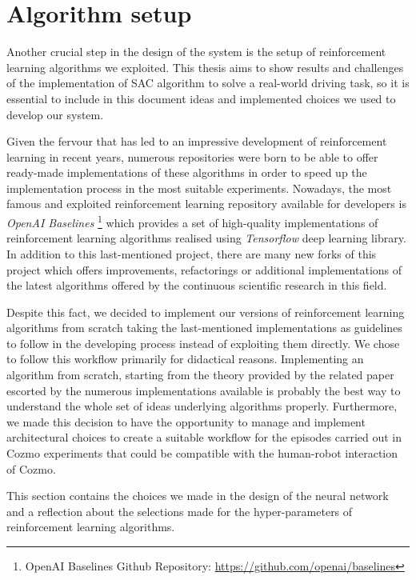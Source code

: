 \section{Algorithm setup}

Another crucial step in the design of the system is the setup of reinforcement learning algorithms we exploited.
This thesis aims to show results and challenges of the implementation of SAC algorithm to solve a real-world driving task, so it is essential to include in this document ideas and implemented choices we used to develop our system.

Given the fervour that has led to an impressive development of reinforcement learning in recent years, numerous repositories were born to be able to offer ready-made implementations of these algorithms in order to speed up the implementation process in the most suitable experiments.
Nowadays, the most famous and exploited reinforcement learning repository available for developers is \textit{OpenAI Baselines} \footnote{OpenAI Baselines Github Repository: \href{https://github.com/openai/baselines}{https://github.com/openai/baselines}} which provides a set of high-quality implementations of reinforcement learning algorithms realised using \textit{Tensorflow} deep learning library.
In addition to this last-mentioned project, there are many new forks of this project which offers improvements, refactorings or additional implementations of the latest algorithms offered by the continuous scientific research in this field.

Despite this fact, we decided to implement our versions of reinforcement learning algorithms from scratch taking the last-mentioned implementations as guidelines to follow in the developing process instead of exploiting them directly.
We chose to follow this workflow primarily for didactical reasons.
Implementing an algorithm from scratch, starting from the theory provided by the related paper escorted by the numerous implementations available is probably the best way to understand the whole set of ideas underlying algorithms properly.
Furthermore, we made this decision to have the opportunity to manage and implement architectural choices to create a suitable workflow for the episodes carried out in Cozmo experiments that could be compatible with the human-robot interaction of Cozmo.

This section contains the choices we made in the design of the neural network and a reflection about the selections made for the hyper-parameters of reinforcement learning algorithms.

